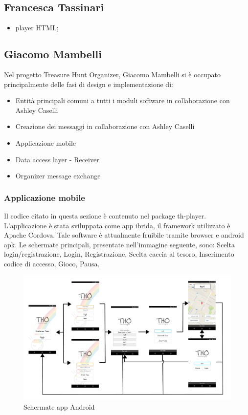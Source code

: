 \documentclass[12pt, italian]{article}
\begin{document}
\subsection{Francesca Tassinari}
\begin{itemize}
	\item player HTML;
\end{itemize}
\subsection{Giacomo Mambelli}
Nel progetto Treasure Hunt Organizer, Giacomo Mambelli si è occupato principalmente delle fasi di design e implementazione di:
\begin{itemize}
	\item Entità principali comuni a tutti i moduli software in collaborazione con Ashley Caselli
	\item Creazione dei messaggi in collaborazione con Ashley Caselli
	\item Applicazione mobile
	\item Data access layer - Receiver
	\item Organizer message exchange
\end{itemize}
\subsubsection{Applicazione mobile}
Il codice citato in questa sezione è contenuto nel package th-player.
L'applicazione è stata sviluppata come app ibrida, il framework utilizzato è Apache Cordova.
Tale software è attualmente fruibile tramite browser e android apk.
Le schermate principali, presentate nell'immagine seguente, sono: Scelta login/registrazione, Login, Registrazione, Scelta caccia al tesoro, Inserimento codice di accesso, Gioco, Pausa.

\begin{figure}[H]
	\centering
	\includegraphics[width=1\textwidth]{img/flusso01.png}
	\caption{Schermate app Android}
\end{figure}
\end{document}
